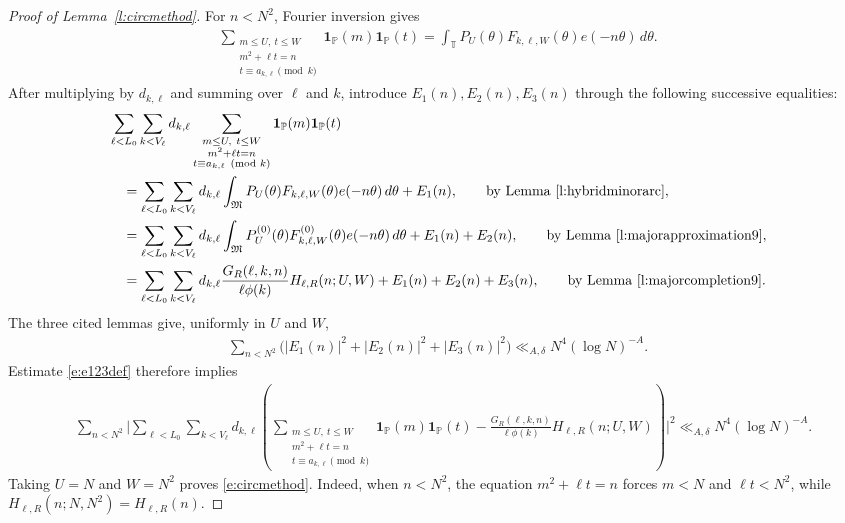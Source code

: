\documentclass[12pt,reqno]{amsart}
\numberwithin{equation}{section}
\theoremstyle{definition}
\theoremstyle{remark}
\newcommand{\one}{\mathbf{1}}
\begin{document}
\begin{proof}[Proof of Lemma~\ref{l:circmethod}]
For \(n<N^2\), Fourier inversion gives
\begin{align}\label{e:fourierinversion9}
 \sum_{\substack{m\leq U,\ t\leq W\\
 m^2+\ell t=n\\
 t\equiv a_{k,\ell}\pmod k}}
 \one_{\mathbb P}(m)\one_{\mathbb P}(t)
 =
 \int_{\mathbb T}
 P_U(\theta)F_{k,\ell,W}(\theta)e(-n\theta)\,d\theta.
\end{align}
After multiplying by \(d_{k,\ell}\) and summing over \(\ell\) and
\(k\), introduce \(E_1(n),E_2(n),E_3(n)\) through the following
successive equalities:
\begin{align}\label{e:e123def}
 &\sum_{\ell<L_0}\sum_{k<V_\ell}d_{k,\ell}
 \sum_{\substack{m\leq U,\ t\leq W\\
 m^2+\ell t=n\\
 t\equiv a_{k,\ell}\pmod k}}
 \one_{\mathbb P}(m)\one_{\mathbb P}(t)\\
 &\quad=
 \sum_{\ell<L_0}\sum_{k<V_\ell}d_{k,\ell}
 \int_{\mathfrak M}
 P_U(\theta)F_{k,\ell,W}(\theta)e(-n\theta)\,d\theta
 +E_1(n),
 \qquad\text{by Lemma~\ref{l:hybridminorarc}},\\
 &\quad=
 \sum_{\ell<L_0}\sum_{k<V_\ell}d_{k,\ell}
 \int_{\mathfrak M}
 P_U^{(0)}(\theta)F_{k,\ell,W}^{(0)}(\theta)
 e(-n\theta)\,d\theta
 +E_1(n)+E_2(n),
 \qquad\text{by Lemma~\ref{l:majorapproximation9}},\\
 &\quad=
 \sum_{\ell<L_0}\sum_{k<V_\ell}d_{k,\ell}
 \frac{G_R(\ell,k,n)}{\ell\phi(k)}
 H_{\ell,R}(n;U,W)
 +E_1(n)+E_2(n)+E_3(n),
 \qquad\text{by Lemma~\ref{l:majorcompletion9}}.
\end{align}
The three cited lemmas give, uniformly in \(U\) and \(W\),
\begin{align}\label{e:threeerrors9}
 \sum_{n<N^2}
 \bigl(
 |E_1(n)|^2+|E_2(n)|^2+|E_3(n)|^2
 \bigr)
 \ll_{A,\delta}N^4(\log N)^{-A}.
\end{align}
Estimate \eqref{e:e123def} therefore implies
\begin{align}\label{e:cutoff9}
 &\sum_{n<N^2}\Bigg|
 \sum_{\ell<L_0}\sum_{k<V_\ell}d_{k,\ell}
 \left(
 \sum_{\substack{m\leq U,\ t\leq W\\
 m^2+\ell t=n\\
 t\equiv a_{k,\ell}\pmod k}}
 \one_{\mathbb P}(m)\one_{\mathbb P}(t)
 -
 \frac{G_R(\ell,k,n)}{\ell\phi(k)}
 H_{\ell,R}(n;U,W)
 \right)\Bigg|^2
 \ll_{A,\delta}N^4(\log N)^{-A}.
\end{align}
Taking \(U=N\) and \(W=N^2\) proves
\eqref{e:circmethod}.  Indeed, when \(n<N^2\), the equation
\(m^2+\ell t=n\) forces \(m<N\) and \(\ell t<N^2\), while $ H_{\ell,R}(n;N,N^2)=H_{\ell,R}(n).$
\end{proof}
\end{document}
